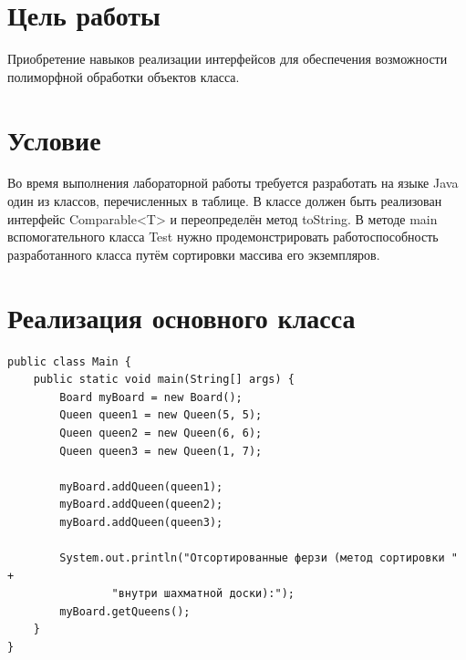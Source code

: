 \documentclass[a4paper, 14pt]{extarticle}
\begin{document}
\newpage
\section{Цель работы}
Приобретение навыков реализации интерфейсов для обеспечения возможности полиморфной обработки объектов класса.

\section{Условие}
Во время выполнения лабораторной работы требуется разработать на языке Java один из
классов, перечисленных в таблице. В классе должен быть реализован интерфейс Comparable<T>
и переопределён метод toString. В методе main вспомогательного класса Test нужно
продемонстрировать работоспособность разработанного класса путём сортировки массива его
экземпляров.

\section{Реализация основного класса}
{\scriptsize
\begin{verbatim}
public class Main {
    public static void main(String[] args) {
        Board myBoard = new Board();
        Queen queen1 = new Queen(5, 5);
        Queen queen2 = new Queen(6, 6);
        Queen queen3 = new Queen(1, 7);

        myBoard.addQueen(queen1);
        myBoard.addQueen(queen2);
        myBoard.addQueen(queen3);

        System.out.println("Отсортированные ферзи (метод сортировки " +
                "внутри шахматной доски):");
        myBoard.getQueens();
    }
}
\end{verbatim}
}
\end{document}
